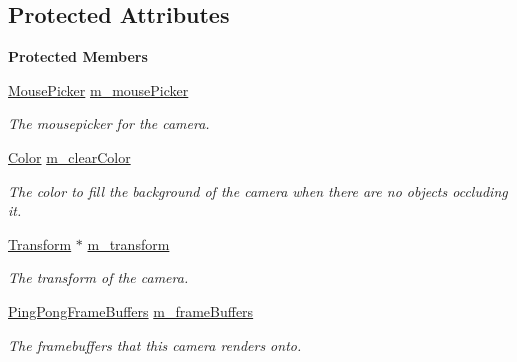 \subsection*{Protected Attributes}
\begin{Indent}\textbf{ Protected Members}\par
\begin{DoxyCompactItemize}
\item 
\mbox{\label{classrev_1_1_camera_a042ea5c20c27a3b2296723ea218f638b}} 
\mbox{\hyperlink{classrev_1_1_mouse_picker}{Mouse\+Picker}} \mbox{\hyperlink{classrev_1_1_camera_a042ea5c20c27a3b2296723ea218f638b}{m\+\_\+mouse\+Picker}}
\begin{DoxyCompactList}\small\item\em The mousepicker for the camera. \end{DoxyCompactList}\item 
\mbox{\label{classrev_1_1_camera_aaaba434a7536357ef729e4685a0822fe}} 
\mbox{\hyperlink{classrev_1_1_color}{Color}} \mbox{\hyperlink{classrev_1_1_camera_aaaba434a7536357ef729e4685a0822fe}{m\+\_\+clear\+Color}}
\begin{DoxyCompactList}\small\item\em The color to fill the background of the camera when there are no objects occluding it. \end{DoxyCompactList}\item 
\mbox{\label{classrev_1_1_camera_a4db8d6afbe06d0a971a802c945212865}} 
\mbox{\hyperlink{classrev_1_1_transform}{Transform}} $\ast$ \mbox{\hyperlink{classrev_1_1_camera_a4db8d6afbe06d0a971a802c945212865}{m\+\_\+transform}}
\begin{DoxyCompactList}\small\item\em The transform of the camera. \end{DoxyCompactList}\item 
\mbox{\label{classrev_1_1_camera_a54a7b1364770ed20f8572f005a0fe186}} 
\mbox{\hyperlink{classrev_1_1_frame_buffer_queue}{Ping\+Pong\+Frame\+Buffers}} \mbox{\hyperlink{classrev_1_1_camera_a54a7b1364770ed20f8572f005a0fe186}{m\+\_\+frame\+Buffers}}
\begin{DoxyCompactList}\small\item\em The framebuffers that this camera renders onto. \end{DoxyCompactList}\item 

\end{DoxyCompactItemize}
\end{Indent}
